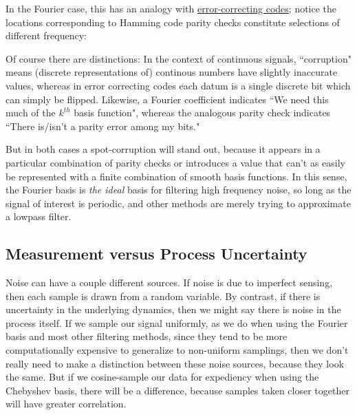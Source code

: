 \documentclass[10pt]{article}
\begin{document}
In the Fourier case, this has an analogy with \href{https://www.youtube.com/watch?v=X8jsijhllIA}{error-correcting codes}\cite{sanderson}\cite{hamming}; notice the locations corresponding to Hamming code parity checks constitute selections of different frequency:

\begin{center}
\end{center}

Of course there are distinctions: In the context of continuous signals, ``corruption" means (discrete representations of) continous numbers have slightly inaccurate values, whereas in error correcting codes each datum is a single discrete bit which can simply be flipped. Likewise, a Fourier coefficient indicates ``We need this much of the $k^{th}$ basis function", whereas the analogous parity check indicates ``There is/isn't a parity error among my bits."

But in both cases a spot-corruption will stand out, because it appears in a particular combination of parity checks or introduces a value that can't as easily be represented with a finite combination of smooth basis functions. In this sense, the Fourier basis is \textit{the ideal} basis for filtering high frequency noise, so long as the signal of interest is periodic, and other methods are merely trying to approximate a lowpass filter.

\subsection{Measurement versus Process Uncertainty}

Noise can have a couple different sources. If noise is due to imperfect sensing, then each sample is drawn from a random variable. By contrast, if there is uncertainty in the underlying dynamics, then we might say there is noise in the process itself. If we sample our signal uniformly, as we do when using the Fourier basis and most other filtering methods, since they tend to be more computationally expensive to generalize to non-uniform samplings\cite{nonuniform}, then we don't really need to make a distinction between these noise sources, because they look the same. But if we cosine-sample our data for expediency when using the Chebyshev basis, there will be a difference, because samples taken closer together will have greater correlation.
\end{document}
